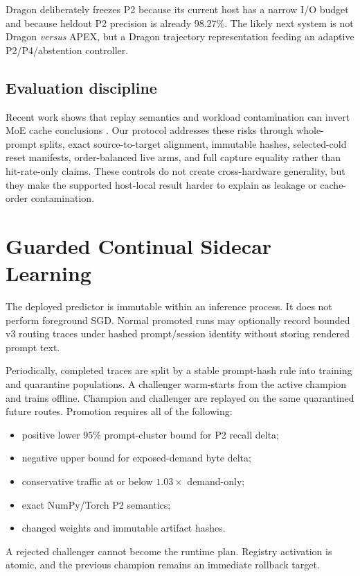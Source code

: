 \documentclass[11pt]{article}
\begin{document}
Dragon deliberately freezes P2 because its current host has a narrow I/O budget and because heldout P2 precision is already 98.27\%. The likely next system is not Dragon \emph{versus} APEX, but a Dragon trajectory representation feeding an adaptive P2/P4/abstention controller.

\subsection{Evaluation discipline}

Recent work shows that replay semantics and workload contamination can invert MoE cache conclusions \citep{zhang2026trace}. Our protocol addresses these risks through whole-prompt splits, exact source-to-target alignment, immutable hashes, selected-cold reset manifests, order-balanced live arms, and full capture equality rather than hit-rate-only claims. These controls do not create cross-hardware generality, but they make the supported host-local result harder to explain as leakage or cache-order contamination.

\section{Guarded Continual Sidecar Learning}

The deployed predictor is immutable within an inference process. It does not perform foreground SGD. Normal promoted runs may optionally record bounded v3 routing traces under hashed prompt/session identity without storing rendered prompt text.

Periodically, completed traces are split by a stable prompt-hash rule into training and quarantine populations. A challenger warm-starts from the active champion and trains offline. Champion and challenger are replayed on the same quarantined future routes. Promotion requires all of the following:
\begin{itemize}
  \item positive lower $95\%$ prompt-cluster bound for P2 recall delta;
  \item negative upper bound for exposed-demand byte delta;
  \item conservative traffic at or below $1.03\times$ demand-only;
  \item exact NumPy/Torch P2 semantics;
  \item changed weights and immutable artifact hashes.
\end{itemize}
A rejected challenger cannot become the runtime plan. Registry activation is atomic, and the previous champion remains an immediate rollback target.
\end{document}

